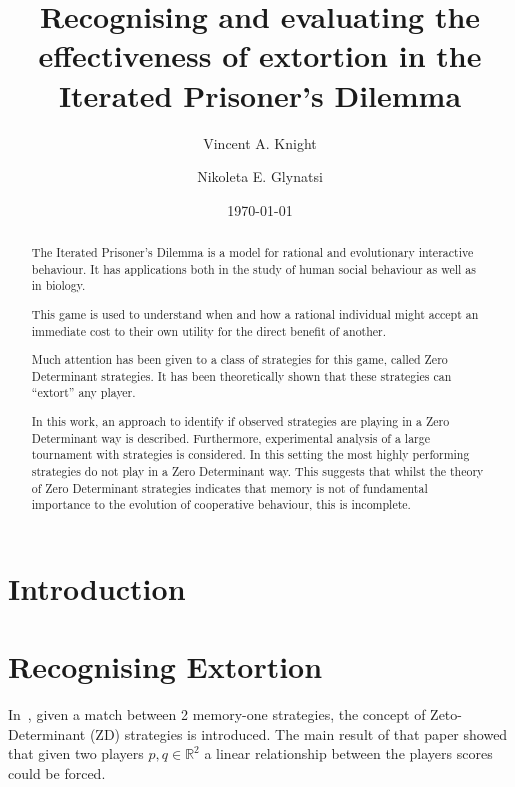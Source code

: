 \documentclass[a4paper]{article}
\title{Recognising and evaluating the effectiveness
       of extortion in the Iterated Prisoner's Dilemma}
\author{Vincent A. Knight \and Nikoleta E. Glynatsi}
\date{\today}
\begin{document}
\maketitle

\begin{abstract}
    The Iterated Prisoner's Dilemma is a model for rational and evolutionary
    interactive behaviour. It has applications both in the study of human social
    behaviour as well as in biology.

    This game is used to understand when and how a rational individual might
    accept an immediate cost to their own utility for the direct benefit of
    another.

    Much attention has been given to a class of strategies for this game, called
    Zero Determinant strategies. It has been theoretically shown that these
    strategies can ``extort'' any player.

    In this work, an approach to identify if observed strategies are playing in
    a Zero Determinant way is described. Furthermore, experimental analysis of
    a large tournament with 
    strategies is considered. In this setting
    the most highly performing strategies do not play in a Zero Determinant way.
    This suggests that whilst the theory of Zero Determinant strategies
    indicates that memory is not of fundamental importance to the evolution of
    cooperative behaviour, this is incomplete.
\end{abstract}

\section{Introduction}\label{sec:introduction}


\section{Recognising Extortion}\label{sec:delta-zd-strategies}


In~\cite{Press2012}, given a match between 2 memory-one strategies, the
concept of Zeto-Determinant (ZD) strategies is introduced. The main result of
that paper showed that given two players \(p, q\in\mathbb{R}^2\) a linear
relationship between the players scores could be forced.
\end{document}
